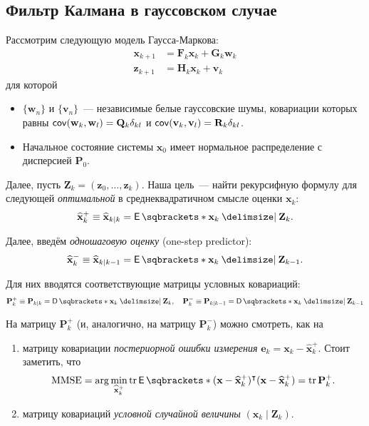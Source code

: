 \subsection{Фильтр Калмана в гауссовском случае}
Рассмотрим следующую модель Гаусса-Маркова:
\begin{align*}
	\mathbf{x}_{k + 1} &= \mathbf{F}_{k}\mathbf{x}_{k} + \mathbf{G}_{k} 
	\mathbf{w}_{k} \\
	\mathbf{z}_{k + 1} &= \mathbf{H}_{k}\mathbf{x}_{k} + \mathbf{v}_{k}
\end{align*}
для которой
\begin{itemize}
	\item \(\{\mathbf{w}_{n}\}\) и \(\{\mathbf{v}_{n}\}\)~--- независимые белые 
	гауссовские шумы, ковариации которых равны \(\operatorname{\mathsf{cov}}(\mathbf{w}_{k}, 
	\mathbf{w}_{l}) = \mathbf{Q}_{k}\delta_{kl}\) и \(\operatorname{\mathsf{cov}}(\mathbf{v}_{k}, 
	\mathbf{v}_{l}) = \mathbf{R}_{k}\delta_{kl}\).
	\item Начальное состояние системы \(\mathbf{x}_{0}\) имеет нормальное 
	распределение с дисперсией \(\mathbf{P}_{0}\).
\end{itemize}

Далее, пусть \(\mathbf{Z}_{k} = (\mathbf{z}_{0}, \ldots, \mathbf{z}_{k})\). 
Наша цель~--- найти рекурсифную формулу для следующей \emph{оптимальной} в 
среднеквадратичном смысле оценки \(\mathbf{x}_{k}\):
\[
	\hat{\mathbf{x}}_{k}^{+} \equiv \hat{\mathbf{x}}_{k \mid k} = 
	\E{\mathbf{x}_{k} \given \mathbf{Z}_{k}}.
\]

Далее, введём \emph{одношаговую оценку} (one-step predictor):
\[
	\hat{\mathbf{x}}_{k}^{-} \equiv \hat{\mathbf{x}}_{k \mid k - 1} = 
	\E{\mathbf{x}_{k} \given \mathbf{Z}_{k - 1}}.
\]

Для них вводятся соответствующие матрицы условных ковариаций:
\[
	\mathbf{P}_{k}^{+} \equiv \mathbf{P}_{k \mid k} = \D{\mathbf{x}_{k} \given 
	\mathbf{Z}_{k}}, \quad \mathbf{P}_{k}^{-} \equiv \mathbf{P}_{k \mid k - 1} 
	= \D{\mathbf{x}_{k} \given \mathbf{Z}_{k - 1}}
\]

\begin{remark}
	На матрицу \(\mathbf{P}_{k}^{+}\) (и, аналогично, на матрицу 
	\(\mathbf{P}_{k}^{-}\)) можно смотреть, как на
	\begin{enumerate}
		\item матрицу ковариации \emph{постериорной ошибки измерения} 
		\(\mathbf{e}_{k} = \mathbf{x}_{k} - \hat{\mathbf{x}}_{k}^{+}\). Стоит 
		заметить, что
		\[
			\mathrm{MMSE} = \arg\min_{\hat{\mathbf{x}}_{k}^{+}} 
			\tr{\E{(\mathbf{x} - \hat{\mathbf{x}}_{k}^{+})^{\intercal} 
			(\mathbf{x} - \hat{\mathbf{x}}_{k}^{+})}} = \tr{\mathbf{P}_{k}^{+}}.
		\]
		
		\item матрицу ковариаций \emph{условной случайной величины} 
		\((\mathbf{x}_{k} \mid \mathbf{Z}_{k})\).
	\end{enumerate}
\end{remark}